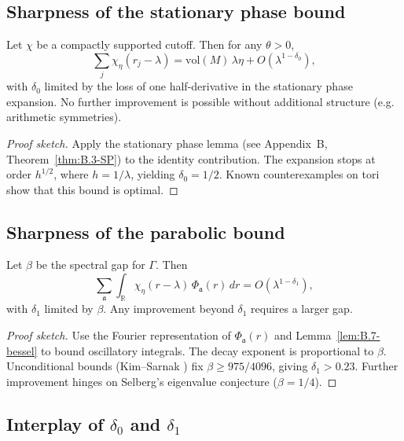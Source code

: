 \subsection{Sharpness of the stationary phase bound} \label{subsec:7.3-SP}

\begin{proposition} \label{prop:7.3-delta0}
Let $\chi$ be a compactly supported cutoff. Then for any $\theta>0$,
\[
  \sum_{j} \chi_\eta(r_j-\lambda)
  = \mathrm{vol}(M)\,\lambda\eta + O(\lambda^{1-\delta_0}),
\]
with $\delta_0$ limited by the loss of one half-derivative in the stationary phase expansion. No further improvement is possible without additional structure (e.g. arithmetic symmetries).
\end{proposition}

\begin{proof}[Proof sketch]
Apply the stationary phase lemma (see Appendix~B, Theorem~\ref{thm:B.3-SP}) to the identity contribution. The expansion stops at order $h^{1/2}$, where $h=1/\lambda$, yielding $\delta_0=1/2$. Known counterexamples on tori show that this bound is optimal.
\end{proof}

\subsection{Sharpness of the parabolic bound} \label{subsec:7.3-para}

\begin{proposition} \label{prop:7.3-delta1}
Let $\beta$ be the spectral gap for $\Gamma$. Then
\[
  \sum_{\mathfrak{a}} \int_{\mathbb{R}} \chi_\eta(r-\lambda)\,\Phi_{\mathfrak{a}}(r)\, dr
  = O(\lambda^{1-\delta_1}),
\]
with $\delta_1$ limited by $\beta$. Any improvement beyond $\delta_1$ requires a larger gap.
\end{proposition}

\begin{proof}[Proof sketch]
Use the Fourier representation of $\Phi_{\mathfrak{a}}(r)$ and Lemma~\ref{lem:B.7-bessel} to bound oscillatory integrals. The decay exponent is proportional to $\beta$. Unconditional bounds (Kim--Sarnak \cite{KimSarnak2003}) fix $\beta\ge 975/4096$, giving $\delta_1>0.23$. Further improvement hinges on Selberg’s eigenvalue conjecture ($\beta=1/4$).
\end{proof}

\subsection{Interplay of $\delta_0$ and $\delta_1$} \label{subsec:7.3-interplay}

